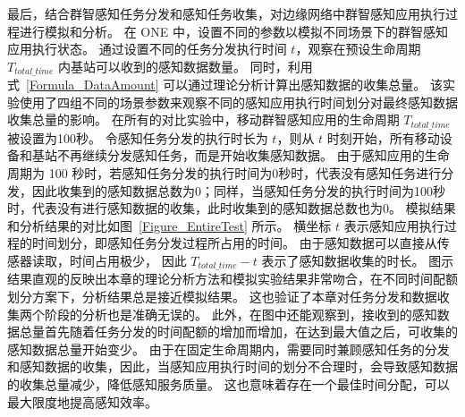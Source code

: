最后，结合群智感知任务分发和感知任务收集，对边缘网络中群智感知应用执行过程进行模拟和分析。
在 ONE 中，设置不同的参数以模拟不同场景下的群智感知应用执行状态。
通过设置不同的任务分发执行时间 $t$，观察在预设生命周期 $T_{total\_time}$ 内基站可以收到的感知数据数量。
同时，利用式~\eqref{Formula_DataAmount} 可以通过理论分析计算出感知数据的收集总量。
该实验使用了四组不同的场景参数来观察不同的感知应用执行时间划分对最终感知数据收集总量的影响。
在所有的对比实验中，移动群智感知应用的生命周期 $T_{total\_time}$ 被设置为100秒。
令感知任务分发的执行时长为 $t$，则从 $t$ 时刻开始，所有移动设备和基站不再继续分发感知任务，而是开始收集感知数据。
由于感知应用的生命周期为 100 秒时，若感知任务分发的执行时间为0秒时，代表没有感知任务进行分发，因此收集到的感知数据总数为0；同样，当感知任务分发的执行时间为100秒时，代表没有进行感知数据的收集，此时收集到的感知数据总数也为0。
模拟结果和分析结果的对比如图~\ref{Figure_EntireTest} 所示。
横坐标 $t$ 表示感知应用执行过程的时间划分，即感知任务分发过程所占用的时间。
由于感知数据可以直接从传感器读取，时间占用极少，
因此 $T_{total\_time} - t$  表示了感知数据收集的时长。
图示结果直观的反映出本章的理论分析方法和模拟实验结果非常吻合，在不同时间配额划分方案下，分析结果总是接近模拟结果。
这也验证了本章对任务分发和数据收集两个阶段的分析也是准确无误的。
此外，在图中还能观察到，接收到的感知数据总量首先随着任务分发的时间配额的增加而增加，在达到最大值之后，可收集的感知数据总量开始变少。
由于在固定生命周期内，需要同时兼顾感知任务的分发和感知数据的收集，因此，当感知应用执行时间的划分不合理时，会导致感知数据的收集总量减少，降低感知服务质量。
这也意味着存在一个最佳时间分配，可以最大限度地提高感知效率。



